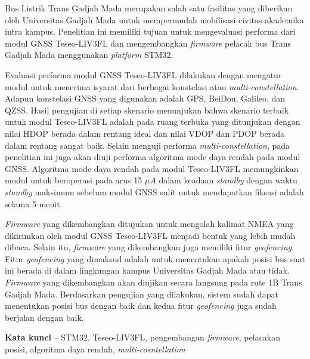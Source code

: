 Bus Listrik Trans Gadjah Mada merupakan salah satu fasilitas yang diberikan oleh Universitas Gadjah Mada untuk mempermudah mobilisasi civitas akademika intra kampus. Penelitian ini memiliki tujuan untuk mengevaluasi performa dari modul GNSS Teseo\hyp{}LIV3FL dan mengembangkan \textit{firmware} pelacak bus Trans Gadjah Mada menggunakan \textit{platform} STM32.

Evaluasi performa modul GNSS Teseo\hyp{}LIV3FL dilakukan dengan mengatur modul untuk menerima isyarat dari berbagai konstelasi atau \textit{multi-constellation}. Adapun konstelasi GNSS yang digunakan adalah GPS, BeiDou, Galileo, dan QZSS. Hasil pengujian di setiap skenario menunjukan bahwa skenario terbaik untuk modul Teseo\hyp{}LIV3FL adalah pada ruang terbuka yang ditunjukan dengan nilai HDOP berada dalam rentang ideal dan nilai VDOP dan PDOP berada dalam rentang sangat baik. Selain menguji performa \textit{multi-constellation}, pada penelitian ini juga akan diuji performa algoritma mode daya rendah pada modul GNSS. Algoritma mode daya rendah pada modul Teseo\hyp{}LIV3FL memungkinkan modul untuk beroperasi pada arus 15 $\mu A$ dalam keadaan \textit{standby} dengan waktu \textit{standby} maksimum sebelum modul GNSS sulit untuk mendapatkan fiksasi adalah selama 5 menit.

\textit{Firmware} yang dikembangkan ditujukan untuk mengolah kalimat NMEA yang dikirimkan oleh modul GNSS Teseo\hyp{}LIV3FL menjadi bentuk yang lebih mudah dibaca. Selain itu, \textit{firmware} yang dikembangkan juga memiliki fitur \textit{geofencing}. Fitur \textit{geofencing} yang dimaksud adalah untuk menentukan apakah posisi bus saat ini berada di dalam lingkungan kampus Universitas Gadjah Mada atau tidak. \textit{Firmware} yang dikembangkan akan diujikan secara langsung pada rute 1B Trans Gadjah Mada. Berdasarkan pengujian yang dilakukan, sistem sudah dapat menentukan posisi bus dengan baik dan kedua fitur \textit{geofencing} juga sudah berjalan dengan baik.

\noindent\textbf{Kata kunci} -- STM32, Teseo\hyp{}LIV3FL, pengembangan \textit{firmware}, pelacakan posisi, algoritma daya rendah, \textit{multi-cosntellation}